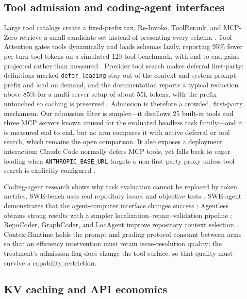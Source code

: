 \documentclass[10pt,twocolumn]{article}
\begin{document}
\subsection{Tool admission and coding-agent interfaces}

Large tool catalogs create a fixed-prefix tax.  Re-Invoke, ToolRerank, and MCP-Zero retrieve a small
candidate set instead of presenting every schema \cite{chen2024reinvoke,zheng2024toolrerank,
fei2025mcpzero}.  Tool Attention gates tools dynamically and loads schemas lazily, reporting 95\%
fewer per-turn tool tokens on a simulated 120-tool benchmark, with end-to-end gains projected rather
than measured \cite{sadani2026toolattention}.  Provider tool search makes deferral first-party:
definitions marked \texttt{defer\_loading} stay out of the context and system-prompt prefix and load on
demand, and the documentation reports a typical reduction above 85\% for a multi-server setup of about
55k tokens, with the prefix untouched so caching is preserved
\cite{anthropicToolSearch,anthropicAdvancedTools,anthropicToolContext}.  Admission is therefore a
crowded, first-party mechanism.  Our admission filter is simpler---it disallows 25 built-in tools and
three MCP servers known unused for the evaluated headless task family---and it is measured end to end,
but no arm compares it with native deferral or tool search, which remains the open comparison.  It
also exposes a deployment interaction: Claude Code normally defers MCP tools, yet falls back to eager
loading when \texttt{ANTHROPIC\_BASE\_URL} targets a non-first-party proxy unless tool search is
explicitly configured \cite{anthropicMCP}.

Coding-agent research shows why task evaluation cannot be replaced by token metrics.  SWE-bench uses
real repository issues and objective tests \cite{jimenez2024swebench}.  SWE-agent demonstrates that
the agent-computer interface changes success \cite{yang2024sweagent}; Agentless obtains strong results
with a simpler localization--repair--validation pipeline \cite{xia2025agentless}; RepoCoder,
GraphCoder, and LocAgent improve repository context selection
\cite{zhang2023repocoder,liu2024graphcoder,chen2025locagent}.  ContextRuntime holds the prompt and
grading protocol constant between arms so that an efficiency intervention must retain
issue-resolution quality; the treatment's admission flag does change the tool surface, so that
quality must survive a capability restriction.

\subsection{KV caching and API economics}
\end{document}
